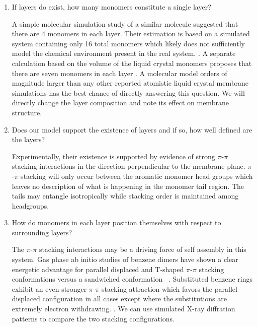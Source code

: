 \documentclass{article}
\begin{document}
  \begin{enumerate}

  \item If layers do exist, how many monomers constitute a single layer? \label{point:monomernum}
  
  A simple molecular simulation study of a similar molecule suggested that
  there are 4 monomers in each layer. Their estimation is based on a simulated
  system containing only 16 total monomers which likely does not sufficiently
  model the chemical environment present in the real system.
  \cite{zhu_methacrylated_2006}.  A separate calculation based on the volume of
  the liquid crystal monomers proposes that there are seven monomers in each
  layer \cite{resel_structural_2000}.  A molecular model orders of magnitude
  larger than any other reported atomistic liquid crystal membrane simulations
  has the best chance of directly answering this question.  We will directly
  change the layer composition and note its effect on membrane structure.

 \item Does our model support the existence of layers and if so, how well
 defined are the layers? \label{point:layers} 

  Experimentally, their existence is supported by evidence of strong $\pi$-$\pi$
  stacking interactions in the direction perpendicular to the membrane plane.
  $\pi$-$\pi$ stacking will only occur between the aromatic monomer head groups
  which leaves no description of what is happening in the monomer tail region.
  The tails may entangle isotropically while stacking order is maintained among
  headgroups. 

  \item How do monomers in each layer position themselves with respect to
  surrounding layers? \label{point:orientation}

  The $\pi$-$\pi$ stacking interactions may be a driving force of self assembly
  in this system. \cite{gazit_possible_2002} Gas phase ab initio studies of
  benzene dimers have shown a clear energetic advantage for parallel displaced
  and T-shaped $\pi$-$\pi$ stacking conformations versus a sandwiched
  conformation ~\cite{sinnokrot_estimates_2002}. Substituted benzene rings
  exhibit an even stronger $\pi$-$\pi$ stacking attraction which favors the
  parallel displaced configuration in all cases except where the substitutions
  are extremely electron withdrawing.
  \cite{waller_hybrid_2006,ringer_effect_2006}. We can use simulated X-ray
  diffration patterns to compare the two stacking configurations. 


\end{enumerate}
\end{document}
